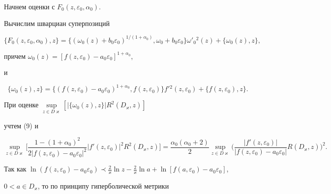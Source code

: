 Начнем оценки с $F_0 ({z,\varepsilon_0,\alpha_0} )$. 


Вычислим шварциан суперпозиций


\begin{equation}


\{F_0 ({z,\varepsilon_0,\alpha_0} ),z\} =


\{({\omega_0 (z)+b_0 \varepsilon_0} 


)^{1/({1+\alpha_0} )},\omega_0+b_0 


\varepsilon_0 \} {\omega}'_0{}^2 (z)+


\{\omega_0 (z),z\},


\end{equation}


причем $\omega_0 (z)=[{f({z,\varepsilon 


_0} )-a_0 \varepsilon_0} ]^{1+\alpha_0}$,


и


$$


\{\omega_0 (z),z\} =\{({f({z,\varepsilon_0 


})-a_0 \varepsilon_0} )^{1+\alpha_0},f(


{z,\varepsilon_0} )\} f'{}^2({z,\varepsilon_0} 


)+\{f({z,\varepsilon_0} ),z\}.


$$


При оценке $\sup\limits_{z \in D\varkappa} [{|\{\omega_0 


(z),z\} |R^2({D_{\varkappa},z})} ]$


учтем (9) и


$$


\sup_{z \in D\varkappa} \bigg[\frac{1-(1+\alpha_0)^2}


{2|f(z,\varepsilon_0)-a_0\varepsilon_0|^2}


|f'(z,\varepsilon_0)|^2R^2(D_\varkappa,z)\bigg]=


\frac{{\alpha_0 ({\alpha_0+2})}}{2}


\sup_{z \in D\varkappa}\bigg(


\frac{|f'(z,\varepsilon_0)|}{|f(z,\varepsilon_0)-a_0\varepsilon_0|}


R(D_\varkappa,z)\bigg)^2.


$$


Так как $\ln({f({z,\varepsilon_0} )-a_0 \varepsilon 


_0} ) \prec\frac{2}{{\varkappa}}\ln z-\frac{2}{{\varkappa}}\ln a+


\ln[{f({a,\varepsilon_0} )-a_0 \varepsilon_0}]$,


$0 < a \in D_{\varkappa}$, то по принципу гиперболической метрики 



